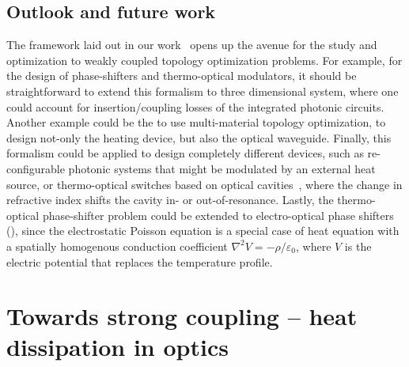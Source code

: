 \subsection*{Outlook and future work}

The framework laid out in our work~\cite{ownpub0} opens up the avenue for the study and optimization to weakly coupled topology optimization problems. For example, for the design of phase-shifters and thermo-optical modulators, it should be straightforward to extend this
formalism to three dimensional system, where one could account for insertion/coupling losses of the integrated photonic circuits. Another example could be the to use multi-material topology optimization, to design not-only the heating
device, but also the optical waveguide. Finally, this formalism could be applied to design completely different devices, such as re-configurable photonic systems that might be modulated by an external heat source, or thermo-optical
switches based on optical cavities~\cite{switch, switch_2}, where the change in refractive index shifts the cavity in- or out-of-resonance. Lastly, the thermo-optical phase-shifter problem could be
extended to electro-optical phase shifters~\cite{pockels} (), since the electrostatic Poisson equation is a special case of heat equation with a spatially homogenous
conduction coefficient $\nabla^2 V = -\rho/\varepsilon_0$, where $V$ is the electric potential that replaces the temperature profile. 

\section{Towards strong coupling -- heat dissipation in optics}\label{sec:thermo_strong_coupling}

